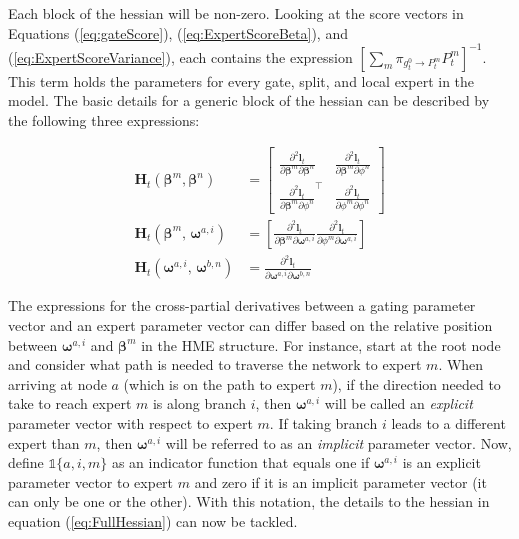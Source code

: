 \documentclass[12pt]{article}
\newcommand{\bw}[1]{\boldsymbol{\omega}^{#1}}
\newcommand{\Ht}[1]{\mathbf{H}_{t}(#1)}
\newcommand{\gateprod}[2]{\pi_{#1 \longrightarrow #2}}
\theoremstyle{definition}
\begin{document}
Each block of the hessian will be non-zero. Looking at the score vectors in Equations
(\ref{eq:gateScore}), (\ref{eq:ExpertScoreBeta}), and (\ref{eq:ExpertScoreVariance}),
each contains the expression $\left[ \sum_{m} \gateprod{g^{0}_{t}}{P^{m}_{t}} P^{m}_{t} \right]^{-1}$.
This term holds the parameters for every gate, split, and local expert in the model. The
basic details for a generic block of the hessian can be described by the following
three expressions:

\begin{align}
  \Ht{\boldsymbol{\beta}^{m}, \boldsymbol{\beta}^{n}} &= \begin{bmatrix} \label{eq:expertNodeHessian}
    \frac{\partial^{2} \boldsymbol{l}_{t}}{\partial \boldsymbol{\beta}^{m} \partial \boldsymbol{\beta}^{n}}    &  \frac{\partial^{2} \boldsymbol{l}_{t}}{\partial \boldsymbol{\beta}^{m} \partial \phi^{n}}     \\
    \frac{\partial^{2} \boldsymbol{l}_{t}}{\partial \boldsymbol{\beta}^{m} \partial \phi^{n}}^{\top}           &  \frac{\partial^{2} \boldsymbol{l}_{t}}{\partial \phi^{m} \partial \phi^{n}}
    \end{bmatrix} \\
    \Ht{\boldsymbol{\beta}^{m}, \, \bw{a, i}} &= \left[ \frac{\partial^{2} \boldsymbol{l}_{t}}{\partial \boldsymbol{\beta}^{m} \partial \bw{a, i}}  \frac{\partial^{2} \boldsymbol{l}_{t}}{ \partial \phi^{m} \partial \bw{a, i} }  \right] \\
    \Ht{\bw{a, i}, \, \bw{b, n}} &= \frac{\partial^{2} \boldsymbol{l}_{t}}{\partial \boldsymbol{\omega}^{a, i} \partial \boldsymbol{\omega}^{b,n}}
\end{align}

\bigskip

The expressions for the cross-partial derivatives
between a gating parameter vector and an expert parameter vector can differ
based on the relative position between $\bw{a, i}$ and
$\boldsymbol{\beta}^{m}$ in the HME structure.
For instance, start at the root node and consider what path is needed to
traverse the network to expert $m$. When arriving at
node $a$ (which is on the path to expert $m$), if the direction needed to take to reach expert $m$ is along
branch $i$, then $\bw{a,i}$ will be called an \textit{explicit} parameter
vector with respect to expert $m$. If taking branch $i$ leads to a different expert
than $m$, then $\bw{a,i}$ will be referred to as an \textit{implicit}
parameter vector. Now, define $\mathbb{1}\{a, i, m\}$ as an indicator function
that equals one if $\bw{a, i}$ is an explicit parameter vector to expert $m$
and zero if it is an implicit parameter vector (it can only be one or the other).
With this notation, the details to the hessian in equation (\ref{eq:FullHessian})
can now be tackled.
\end{document}
